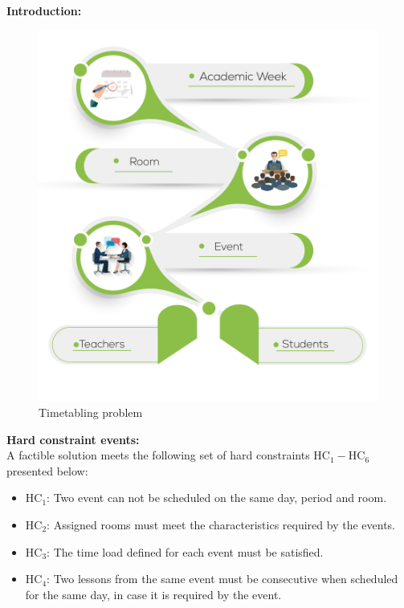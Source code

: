 \documentclass[centering]{report}
\newenvironment{slide}
    {\newpage
    \vspace*{\fill}
    }
    { 
     \vspace*{\fill}
    }
\begin{document}
\begin{slide}
\textbf{Introduction:}\\

\begin{figure}[h!]
  \centering
  \includegraphics[width=0.65\linewidth]{images/timetabling.png}
  \caption{\label{fig:timetabling}Timetabling problem}
\end{figure}

\end{slide}


\begin{slide}
\textbf{Hard constraint events:}\\

A factible solution meets the following set of hard constraints $ \mathrm{HC_{1}-HC_{6}} $ presented below:

\begin{itemize}
\item $\mathrm{HC_{1}}$: {\color{gray}Two event can not be scheduled on the same day, period and room.}
\item $\mathrm{HC_{2}}$: {\color{gray}Assigned rooms must meet the characteristics required by the events.}
\item $\mathrm{HC_{3}}$: {\color{gray}The time load defined for each event must be satisfied.}
\item $\mathrm{HC_{4}}$: {\color{gray}Two lessons from the same event must be consecutive when scheduled for the same  day, in case it is required by the event.}
\end{itemize}

\end{slide}
\end{document}
